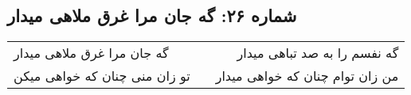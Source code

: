 \begin{center}
\section*{شماره ۲۶: گه جان مرا غرق ملاهی میدار}
\label{sec:026}
\begin{longtable}{l p{0.5cm} r}
گه جان مرا غرق ملاهی میدار
&&
گه نفسم را به صد تباهی میدار
\\
تو زان منی چنان که خواهی میکن
&&
من زان توام چنان که خواهی میدار
\\
\end{longtable}
\end{center}
